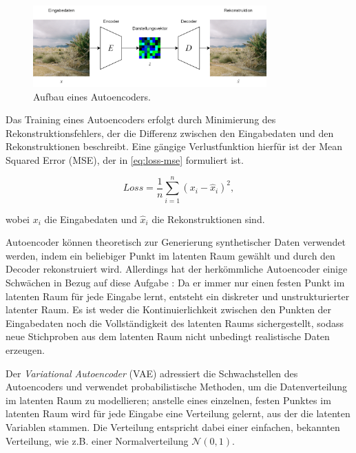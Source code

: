 \begin{figure}[h]
	\centering
	\includegraphics[width=0.8\textwidth]{figure_autoencoder.png}
	\caption{Aufbau eines Autoencoders.}
	\label{fig:autoencoder}
\end{figure}

Das Training eines Autoencoders erfolgt durch Minimierung des Rekonstruktionsfehlers, der die Differenz zwischen den Eingabedaten und den Rekonstruktionen beschreibt. Eine gängige Verlustfunktion hierfür ist der Mean Squared Error (MSE), der in \autoref{eq:loss-mse} formuliert ist.

\begin{equation}
	Loss=\frac{1}{n}\sum_{i=1}^n (x_i-\hat{x}_i)^2,
	\label{eq:loss-mse}
\end{equation}

wobei $x_i$ die Eingabedaten und $\hat{x}_i$ die Rekonstruktionen sind.

Autoencoder können theoretisch zur Generierung synthetischer Daten verwendet werden, indem ein beliebiger Punkt im latenten Raum gewählt und durch den Decoder rekonstruiert wird. Allerdings hat der herkömmliche Autoencoder einige Schwächen in Bezug auf diese Aufgabe \parencite{Foster2020gendeeplearning}: Da er immer nur einen festen Punkt im latenten Raum für jede Eingabe lernt, entsteht ein diskreter und unstrukturierter latenter Raum. Es ist weder die Kontinuierlichkeit zwischen den Punkten der Eingabedaten noch die Vollständigkeit des latenten Raums sichergestellt, sodass neue Stichproben aus dem latenten Raum nicht unbedingt realistische Daten erzeugen.

Der \emph{Variational Autoencoder} (VAE) \parencite{Kingma2013vae} adressiert die Schwachstellen des Autoencoders und verwendet probabilistische Methoden, um die Datenverteilung im latenten Raum zu modellieren; anstelle eines einzelnen, festen Punktes im latenten Raum wird für jede Eingabe eine Verteilung gelernt, aus der die latenten Variablen stammen. Die Verteilung entspricht dabei einer einfachen, bekannten Verteilung, wie z.B. einer Normalverteilung $\mathcal{N}(0,1)$.

